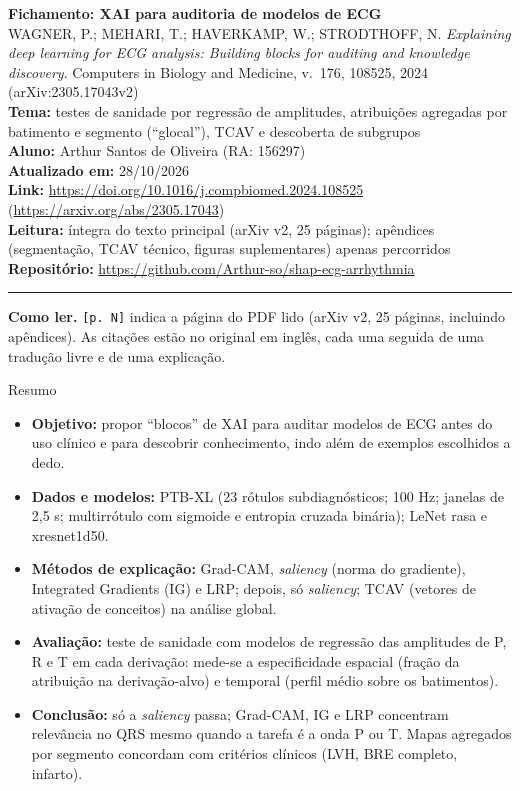 \documentclass[11pt,a4paper]{article}
\begin{document}
\begin{center}
    {\LARGE \textbf{Fichamento: XAI para auditoria de modelos de ECG}} \\[0.35em]
    {\large WAGNER, P.; MEHARI, T.; HAVERKAMP, W.; STRODTHOFF, N. \textit{Explaining deep learning for ECG analysis: Building blocks for auditing and knowledge discovery}. Computers in Biology and Medicine, v.~176, 108525, 2024 (arXiv:2305.17043v2)} \\[0.3em]
    \textbf{Tema:} testes de sanidade por regressão de amplitudes, atribuições agregadas por batimento e segmento (“glocal”), TCAV e descoberta de subgrupos \\[0.2em]
    \textbf{Aluno:} Arthur Santos de Oliveira (RA: 156297) \\[0.2em]
    \textbf{Atualizado em:} 28/10/2026 \\[0.2em]
    \textbf{Link:} \url{https://doi.org/10.1016/j.compbiomed.2024.108525} \quad (\url{https://arxiv.org/abs/2305.17043}) \\[0.2em]
    \textbf{Leitura:} íntegra do texto principal (arXiv v2, 25 páginas); apêndices (segmentação, TCAV técnico, figuras suplementares) apenas percorridos \\[0.2em]
    \textbf{Repositório:} \url{https://github.com/Arthur-so/shap-ecg-arrhythmia}
\end{center}
\vspace{-0.5em}
\hrule
\vspace{0.8em}

\textbf{Como ler.} \texttt{[p. N]} indica a página do PDF lido (arXiv v2, 25 páginas, incluindo apêndices). As citações estão no original em inglês, cada uma seguida de uma tradução livre e de uma explicação.

\begin{infobox}[note]{Resumo}
\begin{itemize}
  \item \textbf{Objetivo:} propor “blocos” de XAI para auditar modelos de ECG antes do uso clínico e para descobrir conhecimento, indo além de exemplos escolhidos a dedo.
  \item \textbf{Dados e modelos:} PTB-XL (23 rótulos subdiagnósticos; 100 Hz; janelas de 2,5 s; multirrótulo com sigmoide e entropia cruzada binária); LeNet rasa e xresnet1d50.
  \item \textbf{Métodos de explicação:} Grad-CAM, \textit{saliency} (norma do gradiente), Integrated Gradients (IG) e LRP; depois, só \textit{saliency}; TCAV (vetores de ativação de conceitos) na análise global.
  \item \textbf{Avaliação:} teste de sanidade com modelos de regressão das amplitudes de P, R e T em cada derivação: mede-se a especificidade espacial (fração da atribuição na derivação-alvo) e temporal (perfil médio sobre os batimentos).
  \item \textbf{Conclusão:} só a \textit{saliency} passa; Grad-CAM, IG e LRP concentram relevância no QRS mesmo quando a tarefa é a onda P ou T. Mapas agregados por segmento concordam com critérios clínicos (LVH, BRE completo, infarto).
\end{itemize}
\end{infobox}
\end{document}
